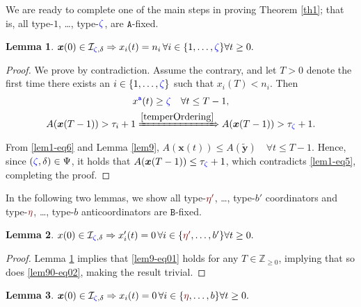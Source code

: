 \documentclass[10 pt,twocolumn,journal]{IEEEtran}
\theoremstyle{plain}
\newtheorem{lemma}{Lemma}
\newcommand{\A}{\mathcal{A}}
\newcommand{\I}{\mathcal{I}}
\newcommand{\x}{\bm{x}}
\newcommand{\y}{\bm{y}}
\renewcommand{\r}{\tb{\zeta}}
\newcommand{\s}{\tr{\eta}}
\renewcommand{\ss}{\tr{\eta'}}
\renewcommand{\d}{{\delta}}
\newcommand{\n}{\tb{\mathtt{a}}}
\renewcommand{\A}{\mathtt{A}}
\newcommand{\B}{\mathtt{B}}
\newcommand{\tb}{\textcolor{blue}}
\newcommand{\tr}{\textcolor{Myred}}
\theoremstyle{definition}
\begin{document}
We are ready to complete one of the main steps in proving Theorem \ref{th1}; that is, all type-$1$, \ldots, type-$\r$, are $\A$-fixed.
%
\begin{lemma}   \label{lem1}
    $
       \x(0)\in\I_{\r,\d} \Rightarrow x_i(t) = n_i\, \forall i\in\{1,\ldots, \r\}\forall t\geq 0.
    $
\end{lemma}
%
\begin{proof}%
    We prove by contradiction. 
    Assume the contrary, and let $T > 0$ denote the first time there exists an $i\in\{1,\ldots, \r\}$ such that $x_i(T) < n_i$.
    Then
    \begin{gather}    
        x^{\n}(t) \geq \r \quad \forall t\leq T-1,  \label{lem1-eq6}\\
        A(\x(T - 1)) > {\tau_i} +1
        \xRightarrow{\eqref{temperOrdering}} A(\x(T - 1)) > {\tau_{\r}} + 1. \label{lem1-eq5}
    \end{gather}
    From \eqref{lem1-eq6} and Lemma \ref{lem9}, 
    $
         A(\x(t))
         \leq A(\tilde{\y})\quad \forall t\leq T-1.
    $
    Hence, since $(\r,\delta)\in\Psi$, it holds that $A(\x(T-1)) \leq {\tau_{\r}}+1$, which contradicts \eqref{lem1-eq5}, completing the proof.
\end{proof}
In the following two lemmas, we show all type-$\ss$, \ldots, type-$b'$ coordinators and type-$\s$, \ldots, type-$b$ anticoordinators are $\B$-fixed.
%
\begin{lemma}   \label{lem10} 
    $
       x(0)\in\I_{\r,\d} 
        \Rightarrow x'_i(t) = 0\, \forall i\in\{\ss,\ldots, b'\}\forall t\geq 0.
    $
\end{lemma}
\begin{proof}
    Lemma \ref{lem1} implies that \eqref{lem9-eq01} holds for any $T\in\mathbb{Z}_{\geq0}$, implying that so does \eqref{lem90-eq02}, making the result trivial.
\end{proof}
%
\begin{lemma}   \label{lem11} 
    $
       \x(0)\in\I_{\r,\d} 
        \Rightarrow x_i(t) = 0\, \forall i\in\{\s,\ldots, b\}\forall t\geq 0.
    $
\end{lemma}
\end{document}
